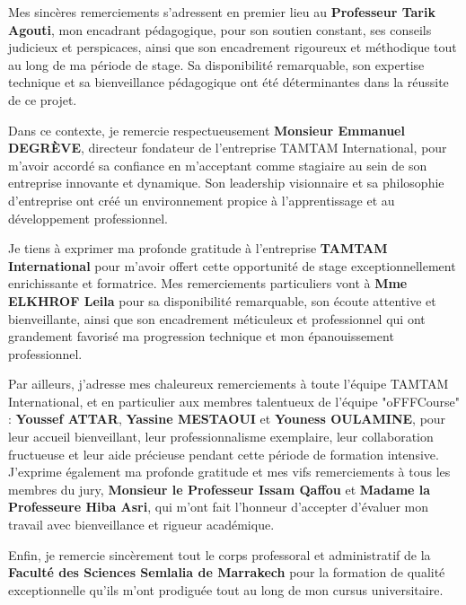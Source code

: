 \documentclass{rapportPFEHIND}
\begin{document}
Mes sincères remerciements s'adressent en premier lieu au \textbf{Professeur Tarik Agouti}, mon encadrant pédagogique, pour son soutien constant, ses conseils judicieux et perspicaces, ainsi que son encadrement rigoureux et méthodique tout au long de ma période de stage. Sa disponibilité remarquable, son expertise technique et sa bienveillance pédagogique ont été déterminantes dans la réussite de ce projet.

Dans ce contexte, je remercie respectueusement \textbf{Monsieur Emmanuel DEGRÈVE}, directeur fondateur de l'entreprise TAMTAM International, pour m'avoir accordé sa confiance en m'acceptant comme stagiaire au sein de son entreprise innovante et dynamique. Son leadership visionnaire et sa philosophie d'entreprise ont créé un environnement propice à l'apprentissage et au développement professionnel.

Je tiens à exprimer ma profonde gratitude à l'entreprise \textbf{TAMTAM International} pour m'avoir offert cette opportunité de stage exceptionnellement enrichissante et formatrice. Mes remerciements particuliers vont à \textbf{Mme ELKHROF Leila} pour sa disponibilité remarquable, son écoute attentive et bienveillante, ainsi que son encadrement méticuleux et professionnel qui ont grandement favorisé ma progression technique et mon épanouissement professionnel.

Par ailleurs, j'adresse mes chaleureux remerciements à toute l'équipe TAMTAM International, et en particulier aux membres talentueux de l'équipe "oFFFCourse" : \textbf{Youssef ATTAR}, \textbf{Yassine MESTAOUI} et \textbf{Youness OULAMINE}, pour leur accueil bienveillant, leur professionnalisme exemplaire, leur collaboration fructueuse et leur aide précieuse pendant cette période de formation intensive.
J'exprime également ma profonde gratitude et mes vifs remerciements à tous les membres du jury, \textbf{Monsieur le Professeur Issam Qaffou} et \textbf{Madame la Professeure Hiba Asri}, qui m'ont fait l'honneur d'accepter d'évaluer mon travail avec bienveillance et rigueur académique.


Enfin, je remercie sincèrement tout le corps professoral et administratif de la \textbf{Faculté des Sciences Semlalia  de Marrakech} pour la formation de qualité exceptionnelle qu'ils m'ont prodiguée tout au long de mon cursus universitaire.

\clearpage

{}
\end{document}
